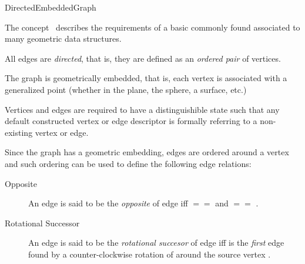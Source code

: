 
\begin{ccRefConcept}{DirectedEmbeddedGraph}


\ccDefinition

The concept \ccRefName\ describes the requirements of a basic
commonly found associated to many geometric data structures.


All edges are {\em directed}, that is, they are defined as an {\em ordered pair} 
of vertices.

The graph is geometrically embedded, that is, each vertex is associated with
 a generalized point (whether in the plane, the sphere, a surface, etc.)

Vertices and edges are required to have a distinguishible  state 
such that any default constructed vertex or edge descriptor is formally
referring to a non-existing vertex or edge.

Since the graph has a geometric embedding, edges are ordered around a vertex 
and such ordering can be used to define the following edge relations:

\begin{description}

\item[Opposite] 
An edge  is said to be the {\em opposite} of edge  
iff  $==$  and  $==$ .

\item[Rotational Successor] 
An edge  is said to be the {\em rotational succesor} 
of edge  iff  is the {\em first} edge found by 
a counter-clockwise rotation of  around the source vertex .
 

\end{description}
\end{ccRefConcept}
